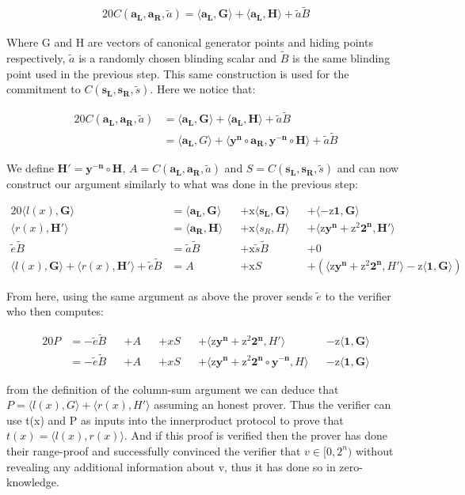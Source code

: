 \documentclass{article}
\newcommand{\eq}[1]{\begin{alignat*}{20}#1\end{alignat*}}
\renewcommand{\vec}[1]{\boldsymbol{#1}}
\newcommand{\ran}[1]{\mathrm{#1}}
\newcommand{\vecran}[1]{\mathbf{#1}}
\newcommand{\dotp}[2]{\langle #1, #2 \rangle}
\begin{document}
\eq{
	C(\vec{a_L}, \vec{a_R}, \widetilde{a}) = \dotp{\vec{a_L}}{\vec{G}} + \dotp{\vec{a_L}}{\vec{H}} + \widetilde{a}\widetilde{B}
}

Where G and H are vectors of canonical generator points and hiding points respectively, $\widetilde{a}$ is a randomly chosen blinding scalar and $\widetilde{B}$ is the same blinding point used in the previous step. This same construction is used for the commitment to $C(\vec{s_L}, \vec{s_R}, \widetilde{s})$. Here we notice that: 

\eq{
	C(\vec{a_L}, \vec{a_R}, \widetilde{a}) &= \dotp{\vec{a_L}}{\vec{G}} + \dotp{\vec{a_L}}{\vec{H}} + \widetilde{a}\widetilde{B} \\
	&= \dotp{\vec{a_L}}{G} + \dotp{\vecran{y^n}\circ \vec{a_R}}{\vecran{y^{-n}}\circ \vec{H}} + \widetilde{a}\widetilde{B}
}

We define $\vec{H'} = \vecran{y^{-n}}\circ\vec{H}$, $A = C(\vec{a_L},\vec{a_R}, \widetilde{a})$ and $S = C(\vec{s_L}, \vec{s_R}, \widetilde{s})$ and can now construct our argument similarly to what was done in the previous step:

\eq{
	\dotp{l(x)}{\vec{G}} &= \dotp{\vec{a_L}}{\vec{G}} &&+ \ran{x}\dotp{\vec{s_L}}{\vec{G}} &&+ \dotp{-\ran{z}\vec{1}}{\vec{G}} \\
	\dotp{r(x)}{\vec{H'}} &= \dotp{\vec{a_R}}{\vec{H}} &&+ \ran{x}\dotp{s_R}{H} &&+ \dotp{\ran{z}\vecran{y^n} + \ran{z^2}\vec{2^n}}{\vec{H'}}\\
	\widetilde{e}\widetilde{B} &= \widetilde{a}\widetilde{B} &&+ \ran{x}\widetilde{s}\widetilde{B} &&+ 0 \\
	\dotp{l(x)}{\vec{G}} + \dotp{r(x)}{\vec{H'}} + \widetilde{e}\widetilde{B} &= A &&+ \ran{x}S &&+ (\dotp{\ran{z}\vecran{y^n} + \ran{z^2}\vec{2^n}}{H'} - \ran{z}\dotp{\vec{1}}{\vec{G}})
}

From here, using the same argument as above the prover sends $\widetilde{e}$ to the verifier who then computes:

\eq{
	P &= -\widetilde{e}\widetilde{B} &&+ A &&+ xS &&+ \dotp{\ran{z}\vecran{y^n} + \ran{z^2}\vec{2^n}}{H'} &&- \ran{z}\dotp{\vec{1}}{\vec{G}} \\
	&= -\widetilde{e}\widetilde{B} &&+ A &&+ xS &&+ \dotp{\ran{z}\vecran{y^n} + \ran{z^2}\vec{2^n}\circ\vecran{y^{-n}}}{H} &&- \ran{z}\dotp{\vec{1}}{\vec{G}}
}

from the definition of the column-sum argument we can deduce that $P = \dotp{l(x)}{G} + \dotp{r(x)}{H'}$ assuming an honest prover. Thus the verifier can use t(x) and P as inputs into the innerproduct protocol to prove that $ t(x) = \dotp{l(x)}{r(x)}$. And if this proof is verified then the prover has done their range-proof and successfully convinced the verifier that $v\in [0,2^n)$ without revealing any additional information about v, thus it has done so in zero-knowledge.
\end{document}
